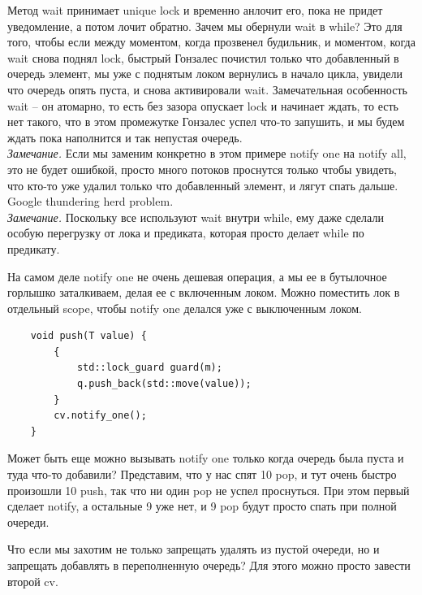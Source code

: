 \documentclass[12pt, a4paper]{article}
\begin{document}
Метод wait принимает unique lock и временно анлочит его, пока не придет уведомление, а потом лочит обратно. Зачем мы обернули wait в while? Это для того, чтобы если между моментом, когда прозвенел будильник, и моментом, когда wait снова поднял lock, быстрый Гонзалес почистил только что добавленный в очередь элемент, мы уже с поднятым локом вернулись в начало цикла, увидели что очередь опять пуста, и снова активировали wait. Замечательная особенность wait -- он атомарно, то есть без зазора опускает lock и начинает ждать, то есть нет такого, что в этом промежутке Гонзалес успел что-то запушить, и мы будем ждать пока наполнится и так непустая очередь.\\
\textit{Замечание.} Если мы заменим конкретно в этом примере notify one на notify all, это не будет ошибкой, просто много потоков проснутся только чтобы увидеть, что кто-то уже удалил только что добавленный элемент, и лягут спать дальше. Google thundering herd problem.\\
\textit{Замечание.} Поскольку все используют wait внутри while, ему даже сделали особую перегрузку от лока и предиката, которая просто делает while по предикату.
\par На самом деле notify one не очень дешевая операция, а мы ее в бутылочное горлышко заталкиваем, делая ее с включенным локом. Можно поместить лок в отдельный scope, чтобы notify one делался уже с выключенным локом.
\begin{verbatim}
	void push(T value) {
		{
			std::lock_guard guard(m);
			q.push_back(std::move(value));
		}
		cv.notify_one();
	}
\end{verbatim}
Может быть еще можно вызывать notify one только когда очередь была пуста и туда что-то добавили? Представим, что у нас спят 10 pop, и тут очень быстро произошли 10 push, так что ни один pop не успел проснуться. При этом первый сделает notify, а остальные 9 уже нет, и 9 pop будут просто спать при полной очереди.
\par Что если мы захотим не только запрещать удалять из пустой очереди, но и запрещать добавлять в переполненную очередь? Для этого можно просто завести второй cv.
\end{document}
